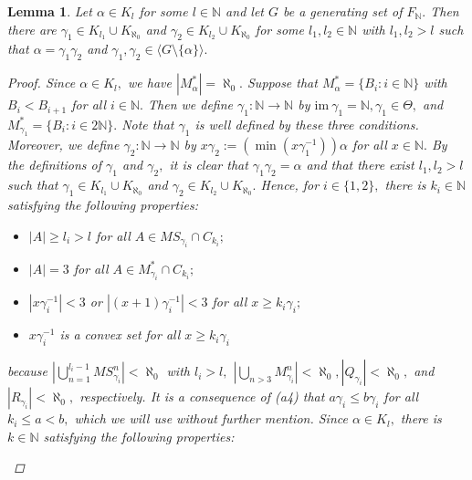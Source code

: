\documentclass[11pt]{article}
\theoremstyle{plain}
\newtheorem{lemma}[theorem]{Lemma}
\theoremstyle{definition}
\newcommand{\im}{\mathrm{im~}}
\begin{document}
\begin{lemma}\label{Proposition1}
Let $\alpha\in K_{l}$ for some $l\in\mathbb{N}$ and let $G$ be a generating set of $F_{\mathbb{N}}.$ Then there are $\gamma_{1}\in K_{l_{1}}\cup K_{\aleph_{0}}$ and $\gamma_{2}\in K_{l_{2}}\cup K_{\aleph_{0}}$ for some $l_{1},l_{2}\in\mathbb{N}$ with $l_{1},l_{2}>l$ such that $\alpha=\gamma_{1}\gamma_{2}$ and $\gamma_{1},\gamma_{2}\in\langle G\setminus\{\alpha\}\rangle.$
\begin{proof}
Since $\alpha\in K_{l},$ we have $\left\vert M_{\alpha}^{*}\right\vert=\aleph_{0}.$ Suppose that $M_{\alpha}^{*}=\{B_{i}: i\in\mathbb{N}\}$ with $B_{i}<B_{i+1}$ for all $i\in\mathbb{N}.$ Then we define $\gamma_{1}:\mathbb{N}\to\mathbb{N}$ by $\im\gamma_{1}=\mathbb{N},\gamma_{1}\in\Theta,$ and $M_{\gamma_{1}}^{*}=\{B_{i}:i\in2\mathbb{N}\}.$ Note that $\gamma_{1}$ is well defined by these three conditions. Moreover, we define $\gamma_{2}:\mathbb{N}\to\mathbb{N}$ by $x\gamma_{2}:=(\min(x\gamma_{1}^{-1}))\alpha$ for all $x\in\mathbb{N}.$ By the definitions of $\gamma_{1}$ and $\gamma_{2},$ it is clear that $\gamma_{1}\gamma_{2}=\alpha$ and that there exist $l_{1},l_{2}>l$ such that $\gamma_{1}\in K_{l_{1}}\cup K_{\aleph_{0}}$ and $\gamma_{2}\in K_{l_{2}}\cup K_{\aleph_{0}}.$ Hence, for $i\in\{1,2\},$ there is $k_{i}\in\mathbb{N}$ satisfying the following properties:
\begin{itemize}
\item[(a1)] $\left\vert A\right\vert\geq l_{i}>l$ for all $A\in MS_{\gamma_{i}}\cap C_{k_{i}};$
\item[(a2)] $\left\vert A \right\vert=3$ for all $A\in M_{\gamma_{i}}^{*}\cap C_{k_{i}};$
\item[(a3)] $\left\vert x\gamma_{i}^{-1}\right\vert<3$ or $\left\vert (x+1)\gamma_{i}^{-1}\right\vert<3$ for all $x\geq k_{i}\gamma_{i};$ 
\item[(a4)] $x\gamma_{i}^{-1}$ is a convex set for all $x\geq k_{i}\gamma_{i}$
\end{itemize}
because $\left\vert\bigcup_{n=1}^{l_{i}-1} MS^{n}_{\gamma_{i}}\right\vert<\aleph_{0}$ with $l_{i}>l,$ $\left\vert\bigcup_{n>3} M^{n}_{\gamma_{i}}\right\vert<\aleph_{0},\left\vert Q_{\gamma_{i}}\right\vert<\aleph_{0},$ and $\left\vert R_{\gamma_{i}}\right\vert<\aleph_{0},$ respectively. It is a consequence of (a4) that $a\gamma_{i}\leq b\gamma_{i}$ for all $k_{i}\leq a<b,$ which we will use without further mention.
Since $\alpha\in K_{l},$ there is $k\in\mathbb{N}$ satisfying the following properties:
\begin{itemize}

\end{itemize}
\end{proof}
\end{lemma}
\end{document}
